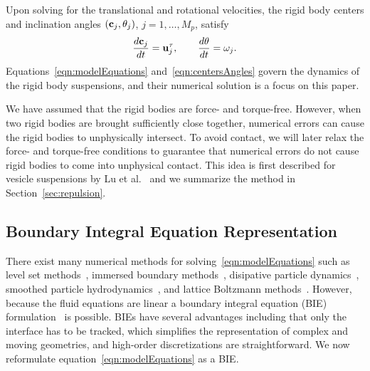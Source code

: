 \documentclass[preprint, 10pt]{elsarticle}
\begin{document}
Upon solving for the translational and rotational velocities, the rigid
body centers and inclination angles $({\mathbf{c}}_j,\theta_j)$,
$j=1,\ldots,M_p$, satisfy
\begin{align}
\begin{split}
  \frac{d{\mathbf{c}}_j}{dt} = {\mathbf{u}}^\tau_j, \qquad 
  \frac{d\theta}{dt} = \omega_j.
\end{split}
\label{eqn:centersAngles}
\end{align}
Equations~\eqref{eqn:modelEquations} and~\eqref{eqn:centersAngles} govern
the dynamics of the rigid body suspensions, and their numerical solution
is a focus on this paper.

We have assumed that the rigid bodies are force- and torque-free.
However, when two rigid bodies are brought sufficiently close together,
numerical errors can cause the rigid bodies to unphysically intersect.
To avoid contact,  we will later relax the force- and torque-free
conditions to guarantee that numerical errors do not cause rigid bodies
to come into unphysical contact.  This idea is first described for
vesicle suspensions by Lu et al.~\cite{Lu2017} and we summarize the
method in Section~\ref{sec:repulsion}.  


\subsection{Boundary Integral Equation Representation}
There exist many numerical methods for
solving~\eqref{eqn:modelEquations} such as level set
methods~\cite{Dou2007}, immersed boundary methods~\cite{Mittal2005},
disipative particle dynamics~\cite{Pivkin2010}, smoothed particle
hydrodynamics~\cite{Polfer2016}, and lattice Boltzmann
methods~\cite{Ladd1994a, Ladd1994b}. However, because the fluid
equations are linear a boundary integral equation (BIE)
formulation~\cite{Pozrikidis1992} is possible.  BIEs have several
advantages including that only the interface has to be tracked, which
simplifies the representation of complex and moving geometries, and
high-order discretizations are straightforward.  We now reformulate
equation~\eqref{eqn:modelEquations} as a BIE.
\end{document}

